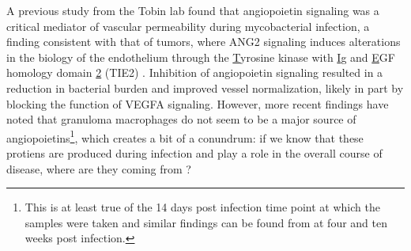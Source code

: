 A previous study from the Tobin lab found that angiopoietin signaling was a critical mediator of vascular permeability during mycobacterial infection, a finding consistent with that of tumors, where ANG2 signaling induces alterations in the biology of the endothelium through the \underline{T}yrosine kinase with \underline{I}g and \underline{E}GF homology domain \underline{2} (TIE2) \citep{Oehlers2017, Duran2021, Goel2012, Thurston2012}. Inhibition of angiopoietin signaling resulted in a reduction in bacterial burden and improved vessel normalization, likely in part by blocking the function of VEGFA signaling. However, more recent findings have noted that granuloma macrophages do not seem to be a major source of angiopoietins\footnote{This is at least true of the 14 days post infection time point at which the samples were taken and similar findings can be found from \citet{Gideon2022} at four and ten weeks post infection.}, which creates a bit of a conundrum: if we know that these protiens are produced during infection and play a role in the overall course of disease, where are they coming from \citep{Cronan2021}?

